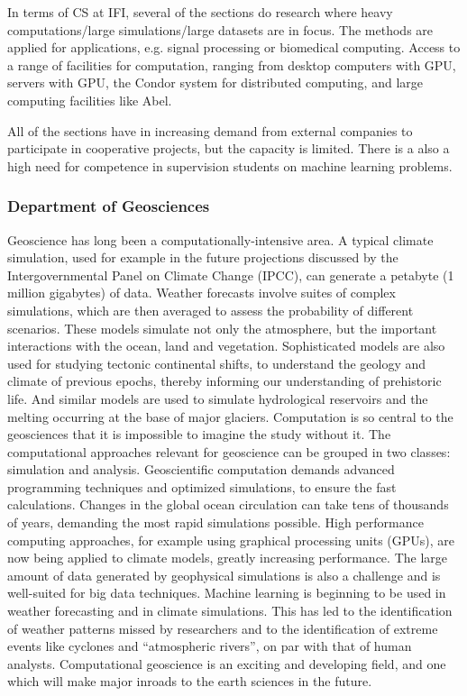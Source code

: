\documentclass[a4paper,10pt]{article}
\begin{document}
In terms of CS at IFI, several of the sections do research where heavy computations/large simulations/large datasets are in focus. The methods are applied for applications, e.g. signal processing or biomedical computing. Access to a range of facilities for computation, ranging from desktop computers with GPU, servers with GPU, the Condor system for distributed computing, and large computing facilities like Abel.

All of the sections have in increasing demand from external companies to participate in cooperative projects, but the capacity is limited. There is a also a high need for competence in supervision students on machine learning problems.





\subsubsection*{Department of  Geosciences}
Geoscience has long been a computationally-intensive area. A typical climate simulation, used for example in the future projections discussed by the Intergovernmental Panel on Climate Change (IPCC), can generate a petabyte (1 million gigabytes) of data. Weather forecasts involve suites of complex simulations, which are then averaged to assess the probability of different scenarios. These models simulate not only the atmosphere, but the important interactions with the ocean, land and vegetation. Sophisticated models are also used for studying tectonic continental shifts, to understand the geology and climate of previous epochs, thereby informing our understanding of prehistoric life. And similar models are used to simulate hydrological reservoirs and the melting occurring at the base of major glaciers. Computation is so central to the geosciences that it is impossible to imagine the study without it.
The computational approaches relevant for geoscience can be grouped in two classes: simulation and analysis. Geoscientific computation demands advanced programming techniques and optimized simulations, to ensure the fast calculations. Changes in the global ocean circulation can take tens of thousands of years, demanding the most rapid simulations possible. High performance computing approaches, for example using graphical processing units (GPUs), are now being applied to climate models, greatly increasing performance. The large amount of data generated by geophysical simulations is also a challenge and is well-suited for big data techniques. Machine learning is beginning to be used in weather forecasting and in climate simulations. This has led to the identification of weather patterns missed by researchers and to the identification of extreme events like cyclones and “atmospheric rivers”, on par with that of human analysts. Computational geoscience is an exciting and developing field, and one which will make major inroads to the earth sciences in the future.
\end{document}

